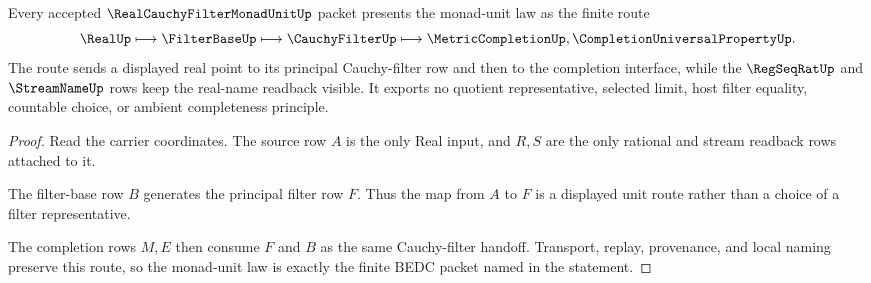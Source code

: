 \begin{theorem}
\label{thm:real-cauchy-filter-monad-unit-law}
Every accepted $\RealCauchyFilterMonadUnitUp$ packet presents the monad-unit law as the finite route
$$
\RealUp \longmapsto \FilterBaseUp \longmapsto \CauchyFilterUp
\longmapsto \MetricCompletionUp,\CompletionUniversalPropertyUp .
$$
The route sends a displayed real point to its principal Cauchy-filter row and then to the completion interface, while the $\RegSeqRatUp$ and $\StreamNameUp$ rows keep the real-name readback visible. It exports no quotient representative, selected limit, host filter equality, countable choice, or ambient completeness principle.
\end{theorem}
\begin{proof}
Read the carrier coordinates. The source row $A$ is the only Real input, and $R,S$ are the only rational and stream readback rows attached to it.

The filter-base row $B$ generates the principal filter row $F$. Thus the map from $A$ to $F$ is a displayed unit route rather than a choice of a filter representative.

The completion rows $M,E$ then consume $F$ and $B$ as the same Cauchy-filter handoff. Transport, replay, provenance, and local naming preserve this route, so the monad-unit law is exactly the finite BEDC packet named in the statement.
\end{proof}




